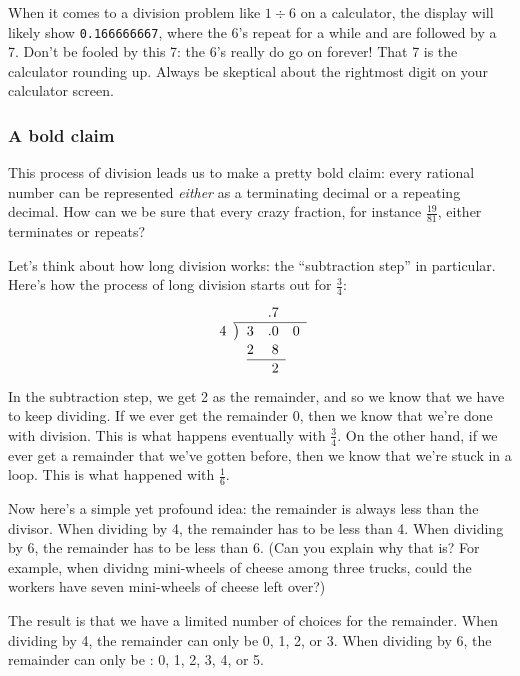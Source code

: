 When it comes to a division problem like $1 \div 6$ on a calculator, the display will likely show \texttt{0.166666667}, where the 6's repeat for a while and are followed by a 7. Don't be fooled by this 7: the 6's really do go on forever! That 7 is the calculator rounding up. Always be skeptical about the rightmost digit on your calculator screen.

\subsubsection{A bold claim}

This process of division leads us to make a pretty bold claim: every rational number can be represented \textit{either} as a terminating decimal or a repeating decimal. How can we be sure that every crazy fraction, for instance $\frac{19}{81}$, either terminates or repeats?

Let's think about how long division works: the ``subtraction step'' in particular. Here's how the process of long division starts out for $\frac{3}{4}$:
\[
\renewcommand\arraystretch{1.1}
\begin{array}{*1r @{\hskip\arraycolsep}c@{\hskip\arraycolsep} *3r}
	&&			& .7	&	\\
\cline{2-5}
4	&\big)&	3	& .0	& 0 \\
	&&		2	&8		\\
\cline{3-4}
	&&			&2 & 	\\
\end{array}
\]
In the subtraction step, we get 2 as the remainder, and so we know that we have to keep dividing. If we ever get the remainder 0, then we know that we're done with division. This is what happens eventually with $\frac{3}{4}$. On the other hand, if we ever get a remainder that we've gotten before, then we know that we're stuck in a loop. This is what happened with $\frac{1}{6}$.

Now here's a simple yet profound idea: the remainder is always less than the divisor. When dividing by 4, the remainder has to be less than 4. When dividing by 6, the remainder has to be less than 6. (Can you explain why that is? For example, when dividng mini-wheels of cheese among three trucks, could the workers have seven mini-wheels of cheese left over?)

The result is that we have a limited number of choices for the remainder. When dividing by 4, the remainder can only be 0, 1, 2, or 3. When dividing by 6, the remainder can only be : 0, 1, 2, 3, 4, or 5.

